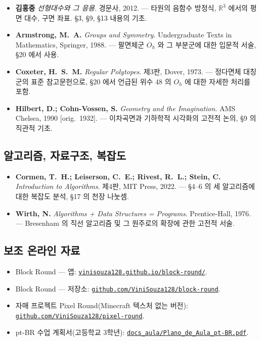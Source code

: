 \documentclass[12pt,a4paper]{scrartcl}
\newcommand{\biblink}[2]{\href{#1}{\nolinkurl{#2}}}
\begin{document}
\begin{itemize}[leftmargin=1.4em,itemsep=0.3em,topsep=0.3em]
  \item \textbf{김홍중} \emph{선형대수와 그 응용}. 경문사, 2012.
        --- 타원의 음함수 방정식, $\mathbb{R}^3$ 에서의 평면 대수,
        구면 좌표. §3, §9, §13 내용의 기초.

  \item \textbf{Armstrong, M.~A.} \emph{Groups and Symmetry}. Undergraduate Texts in
        Mathematics, Springer, 1988.
        --- 팔면체군 $O_h$ 와 그 부분군에 대한 입문적 서술, §20 에서 사용.

  \item \textbf{Coxeter, H.~S.~M.} \emph{Regular Polytopes}. 제3판, Dover, 1973.
        --- 정다면체 대칭군의 표준 참고문헌으로, §20 에서 언급된 위수 48 의 $O_h$ 에 대한 자세한 처리를 포함.

  \item \textbf{Hilbert, D.; Cohn-Vossen, S.} \emph{Geometry and the Imagination}.
        AMS Chelsea, 1990 [orig.~1932].
        --- 이차곡면과 기하학적 시각화의 고전적 논의, §9 의 직관적 기초.
\end{itemize}

\subsection*{알고리즘, 자료구조, 복잡도}

\begin{itemize}[leftmargin=1.4em,itemsep=0.3em,topsep=0.3em]
  \item \textbf{Cormen, T.~H.; Leiserson, C.~E.; Rivest, R.~L.; Stein, C.}
        \emph{Introduction to Algorithms}. 제4판, MIT Press, 2022.
        --- §4--6 의 세 알고리즘에 대한 복잡도 분석, §17 의 천장 나눗셈.

  \item \textbf{Wirth, N.} \emph{Algorithms + Data Structures = Programs}.
        Prentice-Hall, 1976.
        --- Bresenham 의 직선 알고리즘 및 그 원주로의 확장에 관한 고전적 서술.
\end{itemize}

\subsection*{보조 온라인 자료}

\begin{itemize}[leftmargin=1.4em,itemsep=0.3em,topsep=0.3em]
  \item Block Round --- 앱: \biblink{https://vinisouza128.github.io/block-round/}{vinisouza128.github.io/block-round/}.
  \item Block Round --- 저장소: \biblink{https://github.com/ViniSouza128/block-round}{github.com/ViniSouza128/block-round}.
  \item 자매 프로젝트 Pixel Round(Minecraft 텍스처 없는 버전):
        \biblink{https://github.com/ViniSouza128/pixel-round}{github.com/ViniSouza128/pixel-round}.
  \item pt-BR 수업 계획서(고등학교 3학년):
        \biblink{https://vinisouza128.github.io/block-round/docs_aula/Plano_de_Aula_pt-BR.pdf}{docs\_aula/Plano\_de\_Aula\_pt-BR.pdf}.
\end{itemize}
\end{document}
